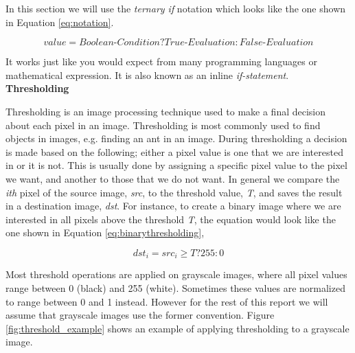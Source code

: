 In this section we will use the \textit{ternary if} notation which looks like the one shown in Equation \ref{eq:notation}.

\begin{equation}
value = {Boolean\mbox{-}Condition} ? {True\mbox{-}Evaluation}: {False\mbox{-}Evaluation}
\label{eq:notation}
\end{equation}

It works just like you would expect from many programming languages or mathematical expression. It is also known as an inline \textit{if-statement}. \\

\noindent \textbf{Thresholding} \par
Thresholding is an image processing technique used to make a final decision about each pixel in an image. Thresholding is most commonly used to find objects in images, e.g. finding an ant in an image\cite{theory1}. During thresholding a decision is made based on the following; either a pixel value is one that we are interested in or it is not. This is usually done by assigning a specific pixel value to the pixel we want, and another to those that we do not want. In general we compare the \textit{ith} pixel of the source image, \textit{src}, to the threshold value, \textit{T}, and saves the result in a destination image, \textit{dst}\cite{theory1}. For instance, to create a binary image where we are interested in all pixels above the threshold \textit{T}, the equation would look like the one shown in Equation \ref{eq:binarythresholding},

\begin{equation}
dst_i = src_i \geq T ? 255: 0
\label{eq:binarythresholding}
\end{equation}

Most threshold operations are applied on grayscale images, where all pixel values range between 0 (black) and 255 (white). Sometimes these values are normalized to range between 0 and 1 instead. However for the rest of this report we will assume that grayscale images use the former convention. Figure \ref{fig:threshold_example} shows an example of applying thresholding to a grayscale image.

